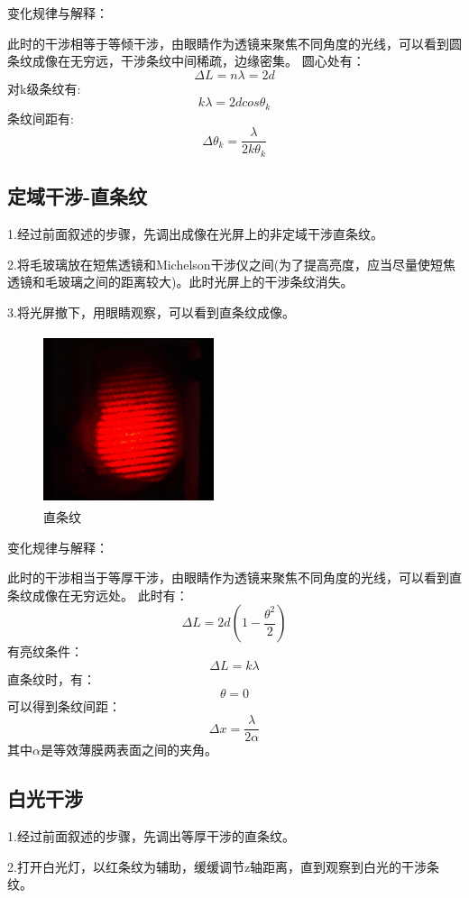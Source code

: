 \documentclass[a4paper, 10pt]{article}
\begin{document}
\noindent 变化规律与解释：

\noindent 此时的干涉相等于等倾干涉，由眼睛作为透镜来聚焦不同角度的光线，可以看到圆条纹成像在无穷远，干涉条纹中间稀疏，边缘密集。
圆心处有：
$$\Delta L=n\lambda=2d$$
对k级条纹有:
$$k\lambda=2dcos\theta_k$$
条纹间距有:
$$\Delta \theta_k=\frac{\lambda}{2k\theta_k}$$

\subsection{定域干涉-直条纹}
\noindent 1.经过前面叙述的步骤，先调出成像在光屏上的非定域干涉直条纹。

\noindent 2.将毛玻璃放在短焦透镜和Michelson干涉仪之间(为了提高亮度，应当尽量使短焦透镜和毛玻璃之间的距离较大)。此时光屏上的干涉条纹消失。

\noindent 3.将光屏撤下，用眼睛观察，可以看到直条纹成像。

\begin{figure}[h]
  \centering 
  \includegraphics[height=5.0cm,width=5.0cm]{p6.png}
  
  \caption{直条纹}
  \label{7}

\end{figure}

\noindent 变化规律与解释：

\noindent 此时的干涉相当于等厚干涉，由眼睛作为透镜来聚焦不同角度的光线，可以看到直条纹成像在无穷远处。
此时有：
$$\Delta L=2d(1-\frac{\theta^2}{2})$$
有亮纹条件：
$$\Delta L=k\lambda$$
直条纹时，有：
$$\theta=0$$
可以得到条纹间距：
$$\Delta x=\frac{\lambda}{2\alpha}$$
其中$\alpha$是等效薄膜两表面之间的夹角。

\subsection{白光干涉}
\noindent 1.经过前面叙述的步骤，先调出等厚干涉的直条纹。

\noindent 2.打开白光灯，以红条纹为辅助，缓缓调节z轴距离，直到观察到白光的干涉条纹。
\end{document}
